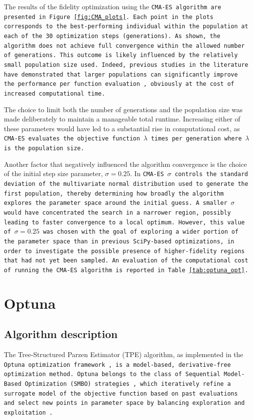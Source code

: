 The results of the fidelity optimization using the \tt{CMA-ES} algorithm are presented in Figure \ref{fig:CMA_plots}. 
Each point in the plots corresponds to the best-performing individual within the population at each of the 30 optimization steps (generations). 
As shown, the algorithm does not achieve full convergence within the allowed number of generations. 
This outcome is likely influenced by the relatively small population size used. 
Indeed, previous studies in the literature have demonstrated that larger populations can significantly improve the performance per function evaluation \cite{hansen2004evaluating}, obviously at the cost of increased computational time.

The choice to limit both the number of generations and the population size was made deliberately to maintain a manageable total runtime. 
Increasing either of these parameters would have led to a substantial rise in computational cost, as \tt{CMA-ES} evaluates the objective function $\lambda$ times per generation where $\lambda$ is the population size.

Another factor that negatively influenced the algorithm convergence is the choice of the initial step size parameter, $\sigma = 0.25$. 
In \tt{CMA-ES} $\sigma$ controls the standard deviation of the multivariate normal distribution used to generate the first population, thereby determining how broadly the algorithm explores the parameter space around the initial guess. 
A smaller $\sigma$ would have concentrated the search in a narrower region, possibly leading to faster convergence to a local optimum. 
However, this value of $\sigma = 0.25$ was chosen with the goal of exploring a wider portion of the parameter space than in previous \texttt{SciPy}-based optimizations, in order to investigate the possible presence of higher-fidelity regions that had not yet been sampled.
An evaluation of the computational cost of running the \tt{CMA-ES} algorithm is reported in Table \ref{tab:optuna_opt}.

\section{Optuna}

\subsection{Algorithm description}

The Tree-Structured Parzen Estimator (TPE) algorithm, as implemented in the \tt{Optuna} optimization framework \cite{optuna_2019}, is a model-based, derivative-free optimization method. 
\tt{Optuna} belongs to the class of Sequential Model-Based Optimization (SMBO) strategies \cite{SMBO_proceedings}, which iteratively refine a surrogate model of the objective function based on past evaluations and select new points in parameter space by balancing exploration and exploitation \cite{BayesianOptimizationReview}.


